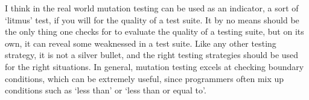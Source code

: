 I think in the real world mutation testing can be used as an indicator, a sort
of `litmus' test, if you will for the quality of a test suite. It by no means
should be the only thing one checks for to evaluate the quality of a testing
suite, but on its own, it can reveal some weaknessed in a test suite. Like any
other testing strategy, it is not a silver bullet, and the right testing
strategies should be used for the right situations. In general, mutation testing
excels at checking boundary conditions, which can be extremely useful, since
programmers often mix up conditions such as `less than' or `less than or equal
to'.
